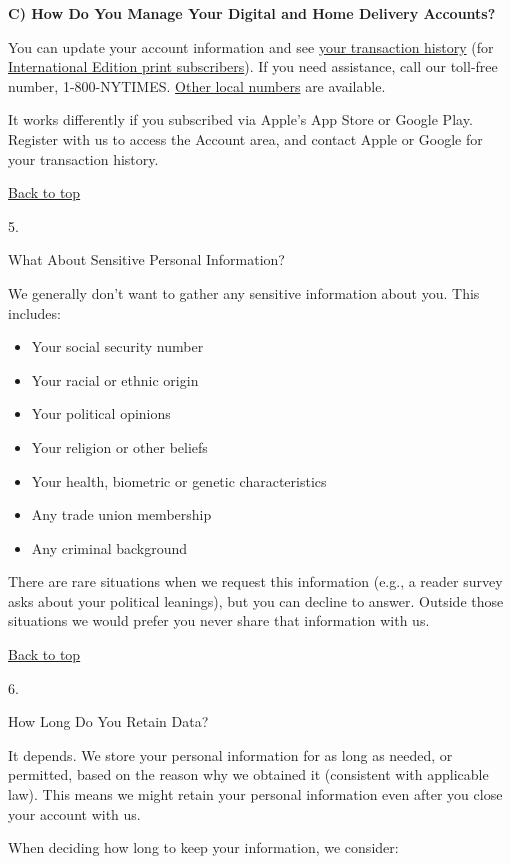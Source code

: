 \textbf{C) How Do You Manage Your Digital and Home Delivery Accounts?}

You can update your account information and see
\href{https://myaccount.nytimes.com}{your transaction history} (for
\href{https://customercare.inyt.com}{International Edition print
subscribers}). If you need assistance, call our toll-free number,
1-800-NYTIMES.
\href{https://subscribe.inyt.com/footer?requestAction=displayContactIht}{Other
local numbers} are available.

It works differently if you subscribed via Apple's App Store or Google
Play. Register with us to access the Account area, and contact Apple or
Google for your transaction history.

\href{app}{Back to top}

5.

What About Sensitive Personal Information?

We generally don't want to gather any sensitive information about you.
This includes:

\begin{itemize}
\tightlist
\item
  Your social security number
\item
  Your racial or ethnic origin
\item
  Your political opinions
\item
  Your religion or other beliefs
\item
  Your health, biometric or genetic characteristics
\item
  Any trade union membership
\item
  Any criminal background
\end{itemize}

There are rare situations when we request this information (e.g., a
reader survey asks about your political leanings), but you can decline
to answer. Outside those situations we would prefer you never share that
information with us.

\href{app}{Back to top}

6.

How Long Do You Retain Data?

It depends. We store your personal information for as long as needed, or
permitted, based on the reason why we obtained it (consistent with
applicable law). This means we might retain your personal information
even after you close your account with us.

When deciding how long to keep your information, we consider:

